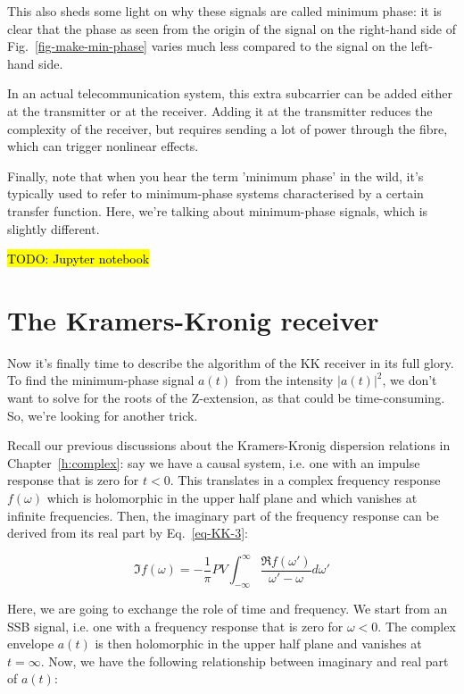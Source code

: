 This also sheds some light on why these signals are called minimum phase: it is clear that the phase as seen from the origin of the signal on the right-hand side of Fig.~\ref{fig-make-min-phase} varies much less compared to the signal on the left-hand side.

In an actual telecommunication system, this extra subcarrier can be added either at the transmitter or at the receiver. Adding it at the transmitter reduces the complexity of the receiver, but requires sending a lot of power through the fibre, which can trigger nonlinear effects.

Finally, note that when you hear the term 'minimum phase' in the wild, it's typically used to refer to minimum-phase systems characterised by a certain transfer function. Here, we're talking about minimum-phase signals, which is slightly different. 

\hl{TODO: Jupyter notebook}

\pagebreak

\section{The Kramers-Kronig receiver}

Now it's finally time to describe the algorithm of the KK receiver in its full glory. To find the minimum-phase signal $a(t)$ from the intensity $|a(t)|^2$, we don't want to solve for the roots of the Z-extension, as that could be time-consuming. So, we're looking for another trick.

Recall our previous discussions about the Kramers-Kronig dispersion relations in Chapter~\ref{h:complex}: say we have a causal system, i.e. one with an impulse response that is zero for $t<0$. This translates in a complex frequency response $f(\omega)$ which is holomorphic in the upper half plane and which vanishes at infinite frequencies. Then, the imaginary part of the frequency response can be derived from its real part by Eq.~\ref{eq-KK-3}:

\begin{equation}
\Im f(\omega) = -\frac{1}{\pi} PV \int_{- \infty}^{\infty} \frac{\Re
    f(\omega')}{\omega'-\omega}d\omega'
\end{equation} 

Here, we are going to exchange the role of time and frequency. We start from an SSB signal, i.e. one with a frequency response that is zero for $\omega<0$. The complex envelope $a(t)$ is then holomorphic in the upper half plane and vanishes at $t=\infty$. Now, we have the following relationship between imaginary and real part of $a(t)$:

